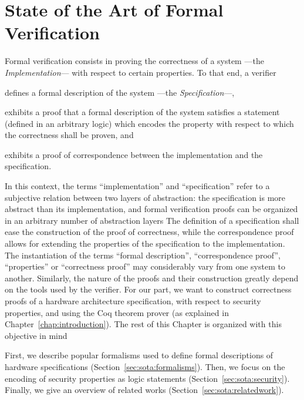 \documentclass[oneside,a4paper]{memoir}
\theoremstyle{break}
\begin{document}
\chapter{State of the Art of Formal Verification}

%

Formal verification consists in proving the correctness of a system ---the
\emph{Implementation}--- with respect to certain properties.
%
To that end, a verifier
%
\begin{inparaenum}[(1)]
\item defines a formal description of the system ---the \emph{Specification}---,
\item exhibits a proof that a formal description of the system satisfies a
  statement (defined in an arbitrary logic) which encodes the property with
  respect to which the correctness shall be proven, and
\item exhibits a proof of correspondence between the implementation and the
  specification.
\end{inparaenum}
%
In this context, the terms ``implementation'' and ``specification'' refer to a
subjective relation between two layers of abstraction: the specification is more
abstract than its implementation, and formal verification proofs can be
organized in an arbitrary number of abstraction layers
%
The definition of a specification shall ease the construction of the proof of
correctness, while the correspondence proof allows for extending the properties
of the specification to the implementation.
%
The instantiation of the terms ``formal description'', ``correspondence proof'',
``properties'' or ``correctness proof'' may considerably vary from one system to
another.
%
Similarly, the nature of the proofs and their construction greatly depend on the
tools used by the verifier.
%
For our part, we want to construct correctness proofs of a hardware architecture
specification, with respect to security properties, and using the Coq theorem
prover (as explained in Chapter~\ref{chap:introduction}).
%
The rest of this Chapter is organized with this objective in mind

First, we describe popular formalisms used to define formal descriptions of
hardware specifications (Section~\ref{sec:sota:formalisms}).
%
Then, we focus on the encoding of security properties as logic statements
(Section~\ref{sec:sota:security}).
%
Finally, we give an overview of related works
(Section~\ref{sec:sota:relatedwork}).
\end{document}
